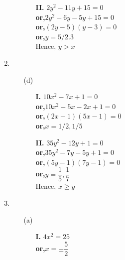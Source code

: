 \begin{multicols}{2}
\begin{enumerate}
\begin{itemize}
\begin{itemize}
\item[{\bf II.}] $2y^2 - 11y + 15 = 0$\\
  {\bf or,}\quad $2y^2 - 6y - 5y + 15 = 0$\\
  {\bf or,}\quad $(2y - 5)(y - 3) = 0$\\
  {\bf or,}\quad $y = 5/2. 3$\\
  Hence, $y > x$
\end{itemize}
\end{itemize}
\item
\begin{itemize}
\item[(d)]
\begin{itemize}
\item[{\bf I.}] $10x^2 - 7x + 1 = 0$\\
  {\bf or,}\quad $10x^2 - 5x - 2x + 1 = 0$\\
  {\bf or,}\quad $(2x - 1)(5x - 1) = 0$\\
  {\bf or,}\quad $x = 1/2, 1/5$
\item[{\bf II.}] $35y^2 - 12y + 1 = 0$\\
  {\bf or,}\quad $35y^2 - 7y - 5y + 1 = 0$\\
  {\bf or,}\quad $(5y - 1)(7y - 1) = 0$\\
  {\bf or,}\quad $y = \dfrac{1}{5}, \dfrac{1}{7}$\\
  Hence, $x \geq y$
\end{itemize}
\end{itemize}
\item
\begin{itemize}
\item[(a)]
\begin{itemize}
\item[{\bf I.}] $4x^2 = 25$\\
  {\bf or,}\quad $x = \pm \dfrac{5}{2}$


\end{itemize}
\end{itemize}
\end{enumerate}
\end{multicols}
